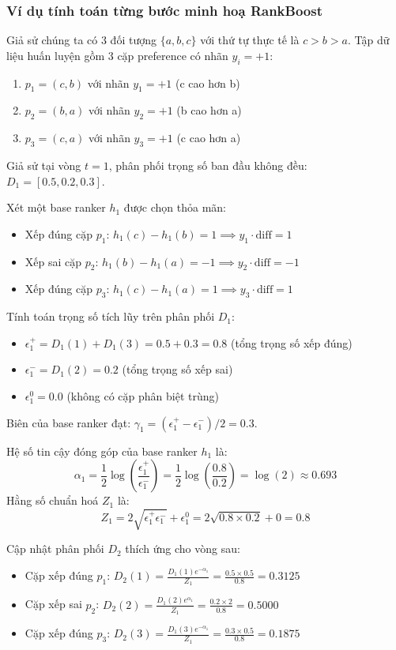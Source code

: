 \subsubsection{Ví dụ tính toán từng bước minh hoạ RankBoost}

Giả sử chúng ta có 3 đối tượng $\{a, b, c\}$ với thứ tự thực tế là $c > b > a$. Tập dữ liệu huấn luyện gồm 3 cặp preference có nhãn $y_i = +1$:
\begin{enumerate}
    \item $p_1 = (c, b)$ với nhãn $y_1 = +1$ (c cao hơn b)
    \item $p_2 = (b, a)$ với nhãn $y_2 = +1$ (b cao hơn a)
    \item $p_3 = (c, a)$ với nhãn $y_3 = +1$ (c cao hơn a)
\end{enumerate}
Giả sử tại vòng $t = 1$, phân phối trọng số ban đầu không đều: $D_1 = [0.5, 0.2, 0.3]$.

Xét một base ranker $h_1$ được chọn thỏa mãn:
\begin{itemize}
    \item Xếp đúng cặp $p_1$: $h_1(c) - h_1(b) = 1 \implies y_1 \cdot \text{diff} = 1$
    \item Xếp sai cặp $p_2$: $h_1(b) - h_1(a) = -1 \implies y_2 \cdot \text{diff} = -1$
    \item Xếp đúng cặp $p_3$: $h_1(c) - h_1(a) = 1 \implies y_3 \cdot \text{diff} = 1$
\end{itemize}

Tính toán trọng số tích lũy trên phân phối $D_1$:
\begin{itemize}
    \item $\epsilon^+_1 = D_1(1) + D_1(3) = 0.5 + 0.3 = 0.8$ (tổng trọng số xếp đúng)
    \item $\epsilon^-_1 = D_1(2) = 0.2$ (tổng trọng số xếp sai)
    \item $\epsilon^0_1 = 0.0$ (không có cặp phân biệt trùng)
\end{itemize}
Biên của base ranker đạt: $\gamma_1 = (\epsilon^+_1 - \epsilon^-_1)/2 = 0.3$.

Hệ số tin cậy đóng góp của base ranker $h_1$ là:
\[
    \alpha_1 = \frac{1}{2} \log\left(\frac{\epsilon^+_1}{\epsilon^-_1}\right) = \frac{1}{2} \log\left(\frac{0.8}{0.2}\right) = \log(2) \approx 0.693
\]
Hằng số chuẩn hoá $Z_1$ là:
\[
    Z_1 = 2\sqrt{\epsilon^+_1 \epsilon^-_1} + \epsilon^0_1 = 2\sqrt{0.8 \times 0.2} + 0 = 0.8
\]

Cập nhật phân phối $D_2$ thích ứng cho vòng sau:
\begin{itemize}
    \item Cặp xếp đúng $p_1$: $D_2(1) = \frac{D_1(1) e^{-\alpha_1}}{Z_1} = \frac{0.5 \times 0.5}{0.8} = 0.3125$
    \item Cặp xếp sai $p_2$: $D_2(2) = \frac{D_1(2) e^{\alpha_1}}{Z_1} = \frac{0.2 \times 2}{0.8} = 0.5000$
    \item Cặp xếp đúng $p_3$: $D_2(3) = \frac{D_1(3) e^{-\alpha_1}}{Z_1} = \frac{0.3 \times 0.5}{0.8} = 0.1875$
\end{itemize}

